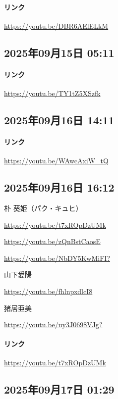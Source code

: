 \paragraph{リンク}
\url{https://youtu.be/DBR6AElELkM}

\subsection*{2025年09月15日 05:11}

\paragraph{リンク}
\url{https://youtu.be/TY1tZ5XSzfk}

\subsection*{2025年09月16日 14:11}

\paragraph{リンク}
\url{https://youtu.be/WAwcAxiW_tQ}

\subsection*{2025年09月16日 16:12}

朴 葵姫（パク・キュヒ）

\url{https://youtu.be/t7xROpDzUMk}

\url{https://youtu.be/zQnBstCaosE}

\url{https://youtu.be/NbDY5KwMiFI?}

山下愛陽

\url{https://youtu.be/fhlnpxdlcI8}

猪居亜美

\url{https://youtu.be/uy3J0698VJg?}

\paragraph{リンク}
\url{https://youtu.be/t7xROpDzUMk}

\subsection*{2025年09月17日 01:29}

